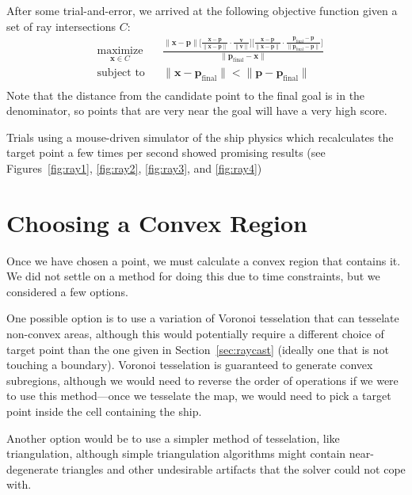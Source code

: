 \documentclass{report}
\begin{document}
After some trial-and-error, we arrived at the following objective function given a set of ray intersections $C$:
\newcommand*{\normalized}[1]{\frac{#1}{\| #1 \|}}
\begin{equation*}
\begin{aligned}
& \underset{\mathbf{x} \in C}{\text{maximize}}
& & \frac{\| \mathbf{x} - \mathbf{p} \| \Big[\normalized{\mathbf{x} - \mathbf{p}} \cdot \normalized{\mathbf{v}}\Big] 
    \Big[\normalized{\mathbf{x} - \mathbf{p}} \cdot \normalized{\mathbf{p}_\text{final} - \mathbf{p}}\Big]}
    {\| \mathbf{p}_\text{final} - \mathbf{x} \|} \\
& \text{subject to}
&& \| \mathbf{x} - \mathbf{p}_\text{final} \| < \| \mathbf{p} - \mathbf{p}_\text{final} \| \\
\end{aligned}
\end{equation*}
Note that the distance from the candidate point to the final goal is in the denominator, so points that are very
near the goal will have a very high score.

Trials using a mouse-driven simulator of the ship physics which recalculates the target point a few times per second
showed promising results (see Figures~\ref{fig:ray1}, \ref{fig:ray2}, \ref{fig:ray3}, and \ref{fig:ray4})

\section{Choosing a Convex Region}
Once we have chosen a point, we must calculate a convex region that contains it.
We did not settle on a method for doing this due to time constraints, but we considered a few 
options.

One possible option is to use a variation of Voronoi tesselation that can tesselate non-convex
areas, although this would potentially require a different choice of target point than the one given in
Section~\ref{sec:raycast} (ideally one that is not touching a boundary). Voronoi tesselation is guaranteed
to generate convex subregions, although we would need to reverse the order of operations if we were to use this
method---once we tesselate the map, we would need to pick a target point inside the cell containing the
ship.

Another option would be to use a simpler method of tesselation, like triangulation, although
simple triangulation algorithms might contain near-degenerate triangles and other undesirable
artifacts that the solver could not cope with.
\end{document}
